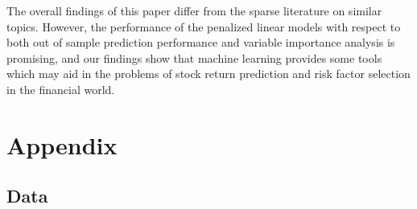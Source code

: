 \documentclass[a4paper, table]{article}
\begin{document}
The overall findings of this paper differ from the sparse literature on similar topics. However, the performance of the penalized linear models with respect to both out of sample prediction performance and variable importance analysis is promising, and our findings show that machine learning provides some tools which may aid in the problems of stock return prediction and risk factor selection in the financial world. 

\section{Appendix}

\subsection{Data}

\end{document}
